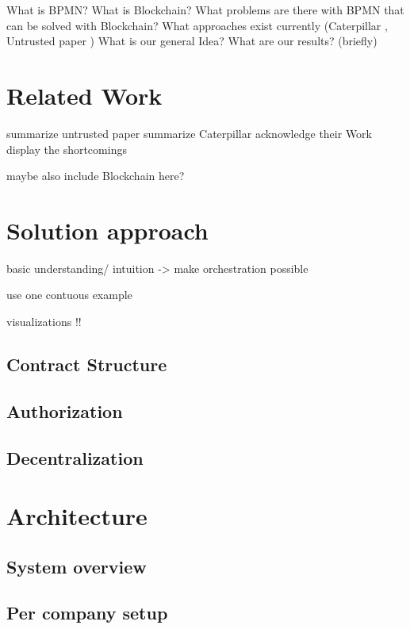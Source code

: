 \documentclass[runningheads]{llncs}
\begin{document}
What is BPMN?
What is Blockchain?
What problems are there with BPMN that can be solved with Blockchain?
What approaches exist currently (Caterpillar \cite{lopez2017caterpillar}, Untrusted paper \cite{weber2016untrusted})
What is our general Idea?
What are our results? (briefly)


\section{Related Work}

summarize untrusted paper
summarize Caterpillar
acknowledge their Work
display the shortcomings

maybe also include Blockchain here? 

\section{Solution approach}

basic understanding/ intuition
-> make orchestration possible

use one contuous example

visualizations !!

\subsection{Contract Structure}

\subsection{Authorization}

\subsection{Decentralization}

\section{Architecture}

\subsection{System overview}

\subsection{Per company setup}
\end{document}
